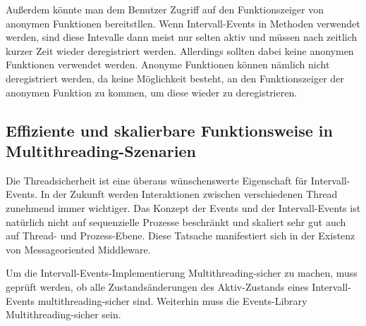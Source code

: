 \documentclass[article,colorback,accentcolor=tud4c]{tudreport}
\begin{document}
Außerdem könnte man dem Benutzer Zugriff auf den Funktionszeiger von
anonymen Funktionen bereitstllen. Wenn Intervall-Events in Methoden verwendet
werden, sind diese Intevalle dann meist nur selten aktiv und müssen nach 
zeitlich kurzer Zeit wieder deregistriert werden. Allerdings sollten dabei 
keine anonymen Funktionen verwendet werden. Anonyme Funktionen können nämlich 
nicht deregistriert werden, da keine Möglichkeit besteht, an den Funktionszeiger
der anonymen Funktion zu kommen, um diese wieder zu deregistrieren.

\subsection{Effiziente und skalierbare Funktionsweise in
Multithreading-Szenarien}
Die Threadsicherheit ist eine überaus wünschenswerte Eigenschaft für
Intervall-Events. In der Zukunft werden Interaktionen zwischen verschiedenen 
Thread zunehmend immer wichtiger. Das Konzept der Events und der
Intervall-Events ist natürlich nicht auf sequenzielle Prozesse beschränkt und
skaliert sehr gut auch auf Thread- und Prozess-Ebene. Diese Tatsache
manifestiert sich in der Existenz von Messageoriented
Middleware. 

Um die Intervall-Events-Implementierung Multithreading-sicher zu machen, muss
geprüft werden, ob alle Zustandsänderungen des Aktiv-Zustands eines
Intervall-Events multithreading-sicher sind. Weiterhin muss die Events-Library
Multithreading-sicher sein.

\listoffigures{}
\end{document}
